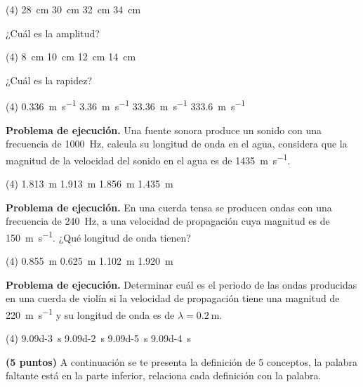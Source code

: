 \documentclass[12pt, letter]{exam}
\begin{document}
\begin{questions}
    \begin{tasks}(4)
        \task \SI{28}{\centi\meter}
        \task \SI{30}{\centi\meter}
        \task \SI{32}{\centi\meter}
        \task \SI{34}{\centi\meter}
    \end{tasks}
    \question \label{completa_grafica_01} ¿Cuál es la amplitud?
    \begin{tasks}(4)
        \task \SI{8}{\centi\meter}
        \task \SI{10}{\centi\meter}
        \task \SI{12}{\centi\meter}
        \task \SI{14}{\centi\meter}
    \end{tasks}
    \question \label{completa_grafica_04} ¿Cuál es la rapidez?
    \begin{tasks}(4)
        \task \SI{0.336}{\meter\per\second}
        \task \SI{3.36}{\meter\per\second}
        \task \SI{33.36}{\meter\per\second}
        \task \SI{333.6}{\meter\per\second}
    \end{tasks}
    \question \textbf{Problema de ejecución.} Una fuente sonora produce un sonido con una frecuencia de \SI{1000}{\hertz}, calcula su longitud de onda en el agua, considera que la magnitud de la velocidad del sonido en el agua es de \SI{1435}{\meter\per\second}.
    \begin{tasks}(4)
        \task \SI{1.813}{\meter}
        \task \SI{1.913}{\meter}
        \task \SI{1.856}{\meter}
        \task \SI{1.435}{\meter}
    \end{tasks}
    \question \textbf{Problema de ejecución.} En una cuerda tensa se producen ondas con una frecuencia de \SI{240}{\hertz}, a una velocidad de propagación cuya magnitud es de \SI{150}{\meter\per\second}. ¿Qué longitud de onda tienen?
     \begin{tasks}(4)
        \task \SI{0.855}{\meter}
        \task \SI{0.625}{\meter}
        \task \SI{1.102}{\meter}
        \task \SI{1.920}{\meter}
    \end{tasks}
    \question \textbf{Problema de ejecución.} Determinar cuál es el periodo de las ondas producidas en una cuerda de violín si la velocidad de propagación tiene una magnitud de \SI{220}{\meter\per\second} y su longitud de onda es de $\lambda = \SI{0.2}{\meter}$.
    \begin{tasks}(4)
        \task \SI{9.09d-3}{\second}
        \task \SI{9.09d-2}{\second}
        \task \SI{9.09d-5}{\second}
        \task \SI{9.09d-4}{\second}
    \end{tasks}
    \question \textbf{(5 puntos)} A continuación se te presenta la definición de 5 conceptos, la palabra faltante está en la parte inferior, relaciona cada definición con la palabra.
    \begin{parts}

\end{parts}
\end{questions}
\end{document}
